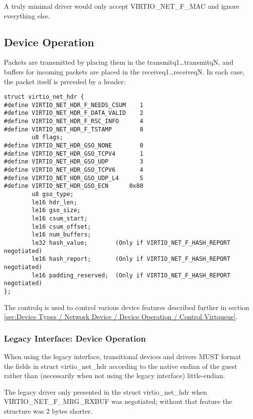 A truly minimal driver would only accept VIRTIO_NET_F_MAC and ignore
everything else.

\subsection{Device Operation}\label{sec:Device Types / Network Device / Device Operation}

Packets are transmitted by placing them in the
transmitq1\ldots transmitqN, and buffers for incoming packets are
placed in the receiveq1\ldots receiveqN. In each case, the packet
itself is preceded by a header:

\begin{lstlisting}
struct virtio_net_hdr {
#define VIRTIO_NET_HDR_F_NEEDS_CSUM    1
#define VIRTIO_NET_HDR_F_DATA_VALID    2
#define VIRTIO_NET_HDR_F_RSC_INFO      4
#define VIRTIO_NET_HDR_F_TSTAMP        8
        u8 flags;
#define VIRTIO_NET_HDR_GSO_NONE        0
#define VIRTIO_NET_HDR_GSO_TCPV4       1
#define VIRTIO_NET_HDR_GSO_UDP         3
#define VIRTIO_NET_HDR_GSO_TCPV6       4
#define VIRTIO_NET_HDR_GSO_UDP_L4      5
#define VIRTIO_NET_HDR_GSO_ECN      0x80
        u8 gso_type;
        le16 hdr_len;
        le16 gso_size;
        le16 csum_start;
        le16 csum_offset;
        le16 num_buffers;
        le32 hash_value;        (Only if VIRTIO_NET_F_HASH_REPORT negotiated)
        le16 hash_report;       (Only if VIRTIO_NET_F_HASH_REPORT negotiated)
        le16 padding_reserved;  (Only if VIRTIO_NET_F_HASH_REPORT negotiated)
};
\end{lstlisting}

The controlq is used to control various device features described further in
section \ref{sec:Device Types / Network Device / Device Operation / Control Virtqueue}.

\subsubsection{Legacy Interface: Device Operation}\label{sec:Device Types / Network Device / Device Operation / Legacy Interface: Device Operation}
When using the legacy interface, transitional devices and drivers
MUST format the fields in struct virtio_net_hdr
according to the native endian of the guest rather than
(necessarily when not using the legacy interface) little-endian.

The legacy driver only presented  in the struct virtio_net_hdr
when VIRTIO_NET_F_MRG_RXBUF was negotiated; without that feature the
structure was 2 bytes shorter.


